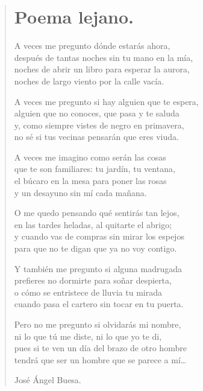 \documentclass[11pt, portrait, twoside, notitlepage, openright]{book}
\begin{document}
\begin{verse}
\begin{center}
\section{Poema lejano.}
\end{center}
A veces me pregunto dónde estarás ahora,\\
después de tantas noches sin tu mano en la mía,\\
noches de abrir un libro para esperar la aurora,\\
noches de largo viento por la calle vacía.
\newline

A veces me pregunto si hay alguien que te espera,\\
alguien que no conoces, que pasa y te saluda\\
y, como siempre vistes de negro en primavera,\\
no sé si tus vecinas pensarán que eres viuda.
\newline

A veces me imagino como serán las cosas\\
que te son familiares: tu jardín, tu ventana,\\
el búcaro en la mesa para poner las rosas\\
y un desayuno sin mí cada mañana.
\newline

O me quedo pensando qué sentirás tan lejos,\\
en las tardes heladas, al quitarte el abrigo;\\
y cuando vas de compras sin mirar los espejos\\
para que no te digan que ya no voy contigo.
\newline

Y también me pregunto si alguna madrugada\\
prefieres no dormirte para soñar despierta,\\
o cómo se entristece de lluvia tu mirada\\
cuando pasa el cartero sin tocar en tu puerta.
\newpage

Pero no me pregunto si olvidarás mi nombre,\\
ni lo que tú me diste, ni lo que yo te di,\\
pues si te ven un día del brazo de otro hombre\\
tendrá que ser un hombre que se parece a mí…
\newline

José Ángel Buesa.
\end{verse}
\end{document}
